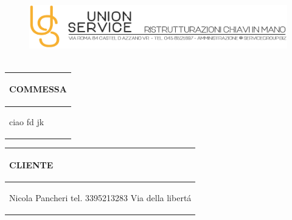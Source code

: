 \documentclass[a4paper]{article}
\begin{document}
                        \begin{figure}[!t]
                        \includegraphics[width=15.8cm, height=3cm]{intestazioneAlta2.jpg}
                        \end{figure}

                        \noindent\begin{tabular}{| L{72.2mm} |}
                            \hline
                            \vspace{2.5mm}
                            \begin{spacing}{0}
                            \textbf{COMMESSA}
                            \end{spacing}\\
                            \hline
                            \vspace{4mm}
                            \begin{spacing}{1.2}

                        ciao \newline fd \newline jk
                          \end{spacing}\\
                            \hline
                          \end{tabular}
                          \quad
                          \begin{tabular}{ | R{72.2mm} | }
                            \hline
                            \vspace{2.5mm}
                            \begin{spacing}{0}
                            \textbf{CLIENTE}
                            \end{spacing}\\
                            \hline
                            \vspace{4mm}
                            \begin{spacing}{1.2}

                       Nicola Pancheri \newline tel. 3395213283 \newline Via della libert\'a
                          \end{spacing}\\
                            \hline
                          \end{tabular}
\end{document}
